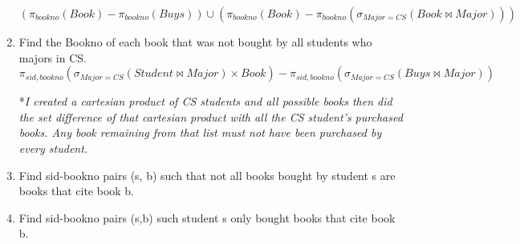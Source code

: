 \documentclass{article}
\begin{document}
\begin{enumerate}
    \begin{displaymath}
        (\pi_{bookno}(Book) - \pi_{bookno}(Buys)) \cup (\pi_{bookno}(Book) - \pi_{bookno}(\sigma_{Major=CS}(Book \bowtie Major)))
    \end{displaymath}

    \item %
    Find the Bookno of each book that was not bought by all students who majors in CS.
    \begin{displaymath}
        \pi_{sid, bookno}(\sigma_{Major=CS}(Student \bowtie Major) \times Book) - \pi_{sid, bookno}(\sigma_{Major=CS}(Buys \bowtie Major))
    \end{displaymath}

    *\textit{I created a cartesian product of CS students and all possible books then did the set difference of that cartesian product
    with all the CS student's purchased books. Any book remaining from that list must not have been purchased by every student.}

    \item %
    Find sid-bookno pairs (s, b) such that not all books bought by student s are books that cite book b.

    \item %
    Find sid-bookno pairs (s,b) such student s only bought books that cite book b.

\end{enumerate}
\end{document}
